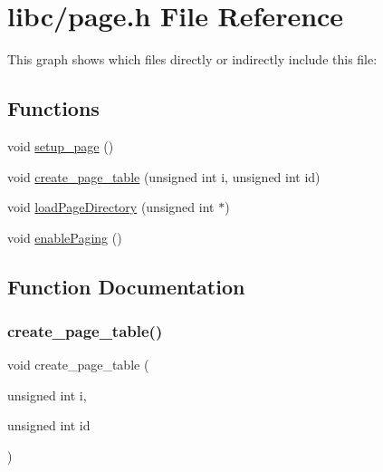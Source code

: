 \hypertarget{a00077}{}\section{libc/page.h File Reference}
\label{a00077}
This graph shows which files directly or indirectly include this file\+:
\subsection*{Functions}
\begin{DoxyCompactItemize}
\item 
void \hyperlink{a00077_a51f6a37816540dea572d38f2713e9f5a_a51f6a37816540dea572d38f2713e9f5a}{setup\+\_\+page} ()
\item 
void \hyperlink{a00077_a7bb2c9b4c69002e17903710ce4de395c_a7bb2c9b4c69002e17903710ce4de395c}{create\+\_\+page\+\_\+table} (unsigned int i, unsigned int id)
\item 
void \hyperlink{a00077_abfdf37b9c42cafa83b39f1a41264989c_abfdf37b9c42cafa83b39f1a41264989c}{load\+Page\+Directory} (unsigned int $\ast$)
\item 
void \hyperlink{a00077_a8fe3a9cca4b2ccd7a2743e9943880a32_a8fe3a9cca4b2ccd7a2743e9943880a32}{enable\+Paging} ()
\end{DoxyCompactItemize}


\subsection{Function Documentation}
\mbox{\label{a00077_a7bb2c9b4c69002e17903710ce4de395c_a7bb2c9b4c69002e17903710ce4de395c}} 
\subsubsection{\texorpdfstring{create\+\_\+page\+\_\+table()}{create\_page\_table()}}
{\footnotesize\ttfamily void create\+\_\+page\+\_\+table (\begin{DoxyParamCaption}\item[{unsigned int}]{i,  }\item[{unsigned int}]{id }\end{DoxyParamCaption})}



